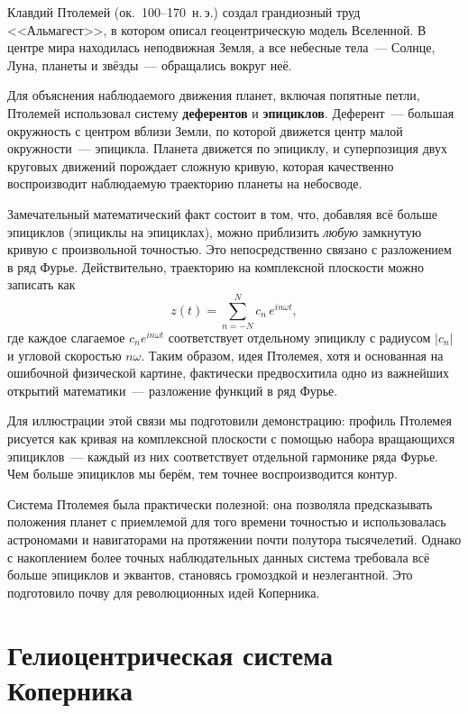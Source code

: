 \documentclass[12pt,a4paper]{article}
\begin{document}
Клавдий Птолемей (ок.~100--170~н.\,э.) создал грандиозный труд <<Альмагест>>,
в котором описал геоцентрическую модель Вселенной. В центре мира находилась
неподвижная Земля, а все небесные тела~--- Солнце, Луна, планеты и звёзды~---
обращались вокруг неё.

Для объяснения наблюдаемого движения планет, включая попятные петли,
Птолемей использовал систему \textbf{деферентов} и \textbf{эпициклов}.
Деферент~--- большая окружность с центром вблизи Земли, по которой движется
центр малой окружности~--- эпицикла. Планета движется по эпициклу, и
суперпозиция двух круговых движений порождает сложную кривую, которая
качественно воспроизводит наблюдаемую траекторию планеты на небосводе.

Замечательный математический факт состоит в том, что, добавляя всё больше
эпициклов (эпициклы на эпициклах), можно приблизить \emph{любую} замкнутую
кривую с произвольной точностью. Это непосредственно связано с разложением
в ряд Фурье. Действительно, траекторию на комплексной плоскости можно
записать как
\begin{equation}
  z(t) = \sum_{n=-N}^{N} c_n \, e^{i n \omega t},
\end{equation}
где каждое слагаемое $c_n e^{in\omega t}$ соответствует отдельному эпициклу
с радиусом $|c_n|$ и угловой скоростью $n\omega$. Таким образом, идея
Птолемея, хотя и основанная на ошибочной физической картине, фактически
предвосхитила одно из важнейших открытий математики~--- разложение функций
в ряд Фурье.

Для иллюстрации этой связи мы подготовили демонстрацию: профиль Птолемея
рисуется как кривая на комплексной плоскости с помощью набора вращающихся
эпициклов~--- каждый из них соответствует отдельной гармонике ряда Фурье.
Чем больше эпициклов мы берём, тем точнее воспроизводится контур.

Система Птолемея была практически полезной: она позволяла предсказывать
положения планет с приемлемой для того времени точностью и использовалась
астрономами и навигаторами на протяжении почти полутора тысячелетий. Однако
с накоплением более точных наблюдательных данных система требовала всё
больше эпициклов и эквантов, становясь громоздкой и неэлегантной. Это
подготовило почву для революционных идей Коперника.

\section{Гелиоцентрическая система Коперника}
\end{document}
